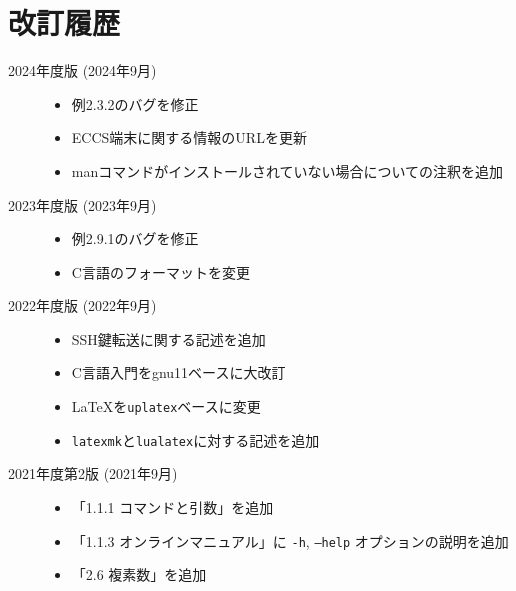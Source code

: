 \section*{改訂履歴}

\noindent
\begin{description}
    \item [2024年度版 (2024年9月)] \mbox{}

       \begin{itemize}
           \item 例2.3.2のバグを修正
           \item ECCS端末に関する情報のURLを更新
           \item manコマンドがインストールされていない場合についての注釈を追加
       \end{itemize}


    \item [2023年度版 (2023年9月)] \mbox{}

       \begin{itemize}
           \item 例2.9.1のバグを修正
           \item C言語のフォーマットを変更
       \end{itemize}


    \item [2022年度版 (2022年9月)] \mbox{}

          \begin{itemize}
              \item SSH鍵転送に関する記述を追加
              \item C言語入門をgnu11ベースに大改訂
              \item \LaTeX を\texttt{uplatex}ベースに変更
              \item \texttt{latexmk}と\texttt{lualatex}に対する記述を追加
          \end{itemize}

    \item[2021年度第2版 (2021年9月)] \mbox{}

          \begin{itemize}
              \item 「1.1.1 コマンドと引数」を追加
              \item 「1.1.3 オンラインマニュアル」に \texttt{-h}, \texttt{--help} オプションの説明を追加
              \item 「2.6 複素数」を追加
          \end{itemize}


\end{description}
